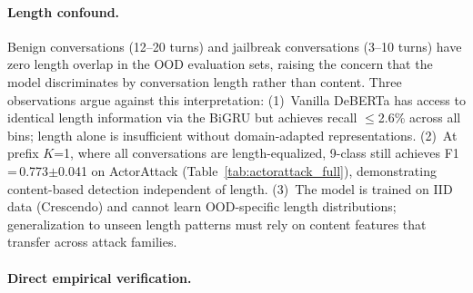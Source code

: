 \paragraph{Length confound.}
Benign conversations (12--20 turns) and jailbreak conversations (3--10 turns) have zero length overlap in the OOD evaluation sets, raising the concern that the model discriminates by conversation length rather than content. Three observations argue against this interpretation:
(1)~Vanilla DeBERTa has access to identical length information via the BiGRU but achieves recall $\leq$2.6\% across all bins; length alone is insufficient without domain-adapted representations.
(2)~At prefix $K$=1, where all conversations are length-equalized, 9-class still achieves F1\,=\,0.773$\pm$0.041 on ActorAttack (Table~\ref{tab:actorattack_full}), demonstrating content-based detection independent of length.
(3)~The model is trained on IID data (Crescendo) and cannot learn OOD-specific length distributions; generalization to unseen length patterns must rely on content features that transfer across attack families.

\paragraph{Direct empirical verification.}
\label{app:length_independence}

